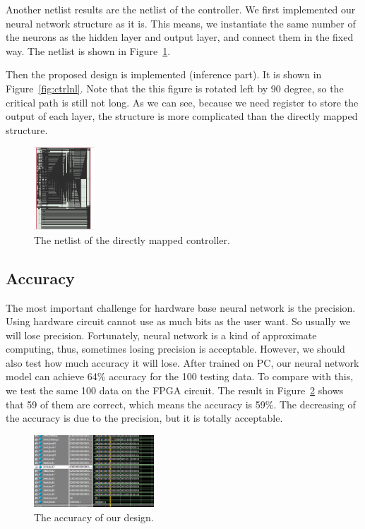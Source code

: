 \documentclass[conference]{IEEEtran}
\begin{document}
Another netlist results are the netlist of the controller. We first implemented our neural network structure as it is. This means, we instantiate the same number of the neurons as the hidden layer and output layer, and connect them in the fixed way. The netlist is shown in Figure~\ref{fig:ctrlnld}. 

Then the proposed design is implemented (inference part). It is shown in Figure~\ref{fig:ctrlnl}. Note that the this figure is rotated left by 90 degree, so the critical path is still not long. As we can see, because we need register to store the output of each layer, the structure is more complicated than the directly mapped structure.

\begin{figure}[!hbt]
	\centering
	\includegraphics[width=0.2\textwidth]{ctrlnld.png}
	\caption{The netlist of the directly mapped controller.}
	\label{fig:ctrlnld}
\end{figure}

\subsection{Accuracy}

The most important challenge for hardware base neural network is the precision. Using hardware circuit cannot use as much bits as the user want. So usually we will lose precision. Fortunately, neural network is a kind of approximate computing, thus, sometimes losing precision is acceptable. However, we should also test how much accuracy it will lose.
After trained on PC, our neural network model can achieve 64\% accuracy for the 100 testing data. To compare with this, we test the same 100 data on the FPGA circuit. The result in Figure~\ref{fig:acc} shows that 59 of them are correct, which means the accuracy is 59\%. The decreasing of the accuracy is due to the precision, but it is totally acceptable.

\begin{figure}[!hbt]
	\centering
	\includegraphics[width=0.4\textwidth]{accuracy.png}
	\caption{The accuracy of our design.}
	\label{fig:acc}
\end{figure}
\end{document}
